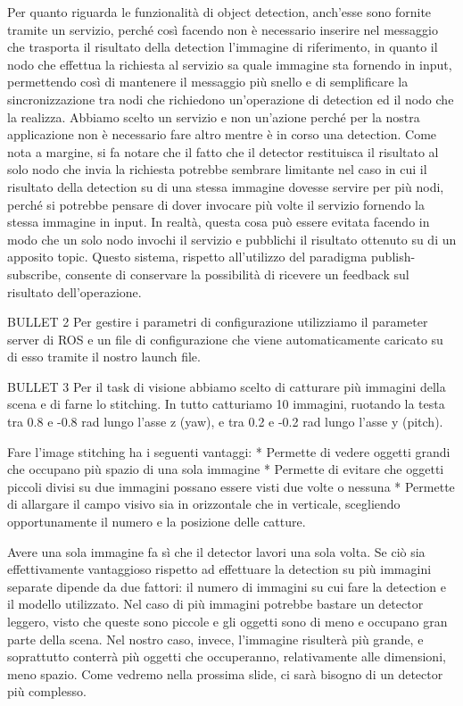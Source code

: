 Per quanto riguarda le funzionalità di object detection, anch'esse sono fornite tramite un servizio, perché così facendo non è necessario inserire nel messaggio che trasporta il risultato della detection l'immagine di riferimento, in quanto il nodo che effettua la richiesta al servizio sa quale immagine sta fornendo in input, permettendo così di mantenere il messaggio più snello e di semplificare la sincronizzazione tra nodi che richiedono un'operazione di detection ed il nodo che la realizza.
Abbiamo scelto un servizio e non un'azione perché per la nostra applicazione non è necessario fare altro mentre è in corso una detection.
Come nota a margine, si fa notare che il fatto che il detector restituisca il risultato al solo nodo che invia la richiesta potrebbe sembrare limitante nel caso in cui il risultato della detection su di una stessa immagine dovesse servire per più nodi, perché si potrebbe pensare di dover invocare più volte il servizio fornendo la stessa immagine in input. In realtà, questa cosa può essere evitata facendo in modo che un solo nodo invochi il servizio e pubblichi il risultato ottenuto su di un apposito topic. Questo sistema, rispetto all'utilizzo del paradigma publish-subscribe, consente di conservare la possibilità di ricevere un feedback sul risultato dell'operazione. 

BULLET 2
Per gestire i parametri di configurazione utilizziamo il parameter server di ROS e un file di configurazione che viene automaticamente caricato su di esso tramite il nostro launch file.

BULLET 3
Per il task di visione abbiamo scelto di catturare più immagini della scena e di farne lo stitching. In tutto catturiamo 10 immagini, ruotando la testa tra 0.8 e -0.8 rad lungo l'asse z (yaw), e tra 0.2 e -0.2 rad lungo l'asse y (pitch). 

Fare l'image stitching ha i seguenti vantaggi:
* Permette di vedere oggetti grandi che occupano più spazio di una sola immagine
* Permette di evitare che oggetti piccoli divisi su due immagini possano essere visti due volte o nessuna
* Permette di allargare il campo visivo sia in orizzontale che in verticale, scegliendo opportunamente il numero e la posizione delle catture.

Avere una sola immagine fa sì che il detector lavori una sola volta. Se ciò sia effettivamente vantaggioso rispetto ad effettuare la detection su più immagini separate dipende da due fattori: il numero di immagini su cui fare la detection e il modello utilizzato. Nel caso di più immagini potrebbe bastare un detector leggero, visto che queste sono piccole e gli oggetti sono di meno e occupano gran parte della scena. Nel nostro caso, invece, l'immagine risulterà più grande, e soprattutto conterrà più oggetti che occuperanno, relativamente alle dimensioni, meno spazio. Come vedremo nella prossima slide, ci sarà bisogno di un detector più complesso.


